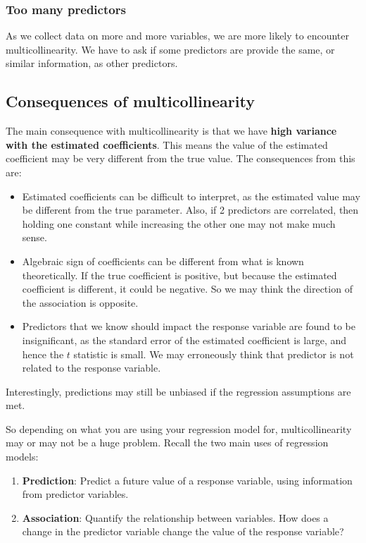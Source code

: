 \documentclass[
]{book}
\providecommand{\tightlist}{%
  \setlength{\itemsep}{0pt}\setlength{\parskip}{0pt}}
\begin{document}
\hypertarget{too-many-predictors}{%
\subsubsection{Too many predictors}\label{too-many-predictors}}

As we collect data on more and more variables, we are more likely to encounter multicollinearity. We have to ask if some predictors are provide the same, or similar information, as other predictors.

\hypertarget{consequences-of-multicollinearity}{%
\subsection{Consequences of multicollinearity}\label{consequences-of-multicollinearity}}

The main consequence with multicollinearity is that we have \textbf{high variance with the estimated coefficients}. This means the value of the estimated coefficient may be very different from the true value. The consequences from this are:

\begin{itemize}
\item
  Estimated coefficients can be difficult to interpret, as the estimated value may be different from the true parameter. Also, if 2 predictors are correlated, then holding one constant while increasing the other one may not make much sense.
\item
  Algebraic sign of coefficients can be different from what is known theoretically. If the true coefficient is positive, but because the estimated coefficient is different, it could be negative. So we may think the direction of the association is opposite.
\item
  Predictors that we know should impact the response variable are found to be insignificant, as the standard error of the estimated coefficient is large, and hence the \(t\) statistic is small. We may erroneously think that predictor is not related to the response variable.
\end{itemize}

Interestingly, predictions may still be unbiased if the regression assumptions are met.

So depending on what you are using your regression model for, multicollinearity may or may not be a huge problem. Recall the two main uses of regression models:

\begin{enumerate}
\def\labelenumi{\arabic{enumi}.}
\tightlist
\item
  \textbf{Prediction}: Predict a future value of a response variable, using information from predictor variables.
\item
  \textbf{Association}: Quantify the relationship between variables. How does a change in the predictor variable change the value of the response variable?
\end{enumerate}
\end{document}
